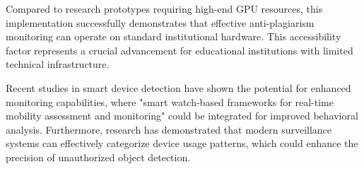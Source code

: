 \documentclass[conference]{IEEEtran}
\begin{document}
Compared to research prototypes requiring high-end GPU resources, this implementation successfully demonstrates that effective anti-plagiarism monitoring can operate on standard institutional hardware. This accessibility factor represents a crucial advancement for educational institutions with limited technical infrastructure.

Recent studies in smart device detection have shown the potential for enhanced monitoring capabilities, where "smart watch-based frameworks for real-time mobility assessment and monitoring" could be integrated for improved behavioral analysis\cite{kheirkhahan2018smartwatch}. Furthermore, research has demonstrated that modern surveillance systems can effectively categorize device usage patterns, which could enhance the precision of unauthorized object detection\cite{moshawrab2023value}.
\end{document}
